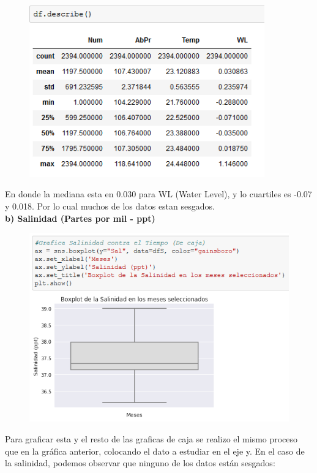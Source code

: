 \documentclass[12pt]{article}
\begin{document}
\begin{figure}[h]
    \centering
\includegraphics[width=4in]{dfdescribe.png}
\end{figure}
 
 En donde la mediana esta en 0.030 para WL (Water Level), y lo cuartiles es -0.07 y 0.018. Por lo cual muchos de los datos estan sesgados. \\
 
\noindent\textbf { b) Salinidad (Partes por mil - ppt)} \\

\begin{figure}[h]
    \centering
\includegraphics[width=4.5in]{Caja2.png}
\end{figure}

Para graficar esta y el resto de las graficas de caja se realizo el mismo proceso que en la gráfica anterior, colocando el dato a estudiar en el eje y. En el caso de la salinidad, podemos observar que ninguno de los datos están sesgados:
\end{document}
